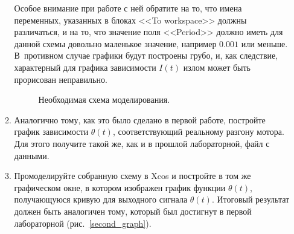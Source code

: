 \documentclass[12pt, a4paper, openany]{extarticle}
\begin{document}
\begin{enumerate}
\begin{enumerate}
Особое внимание при работе с ней обратите на то, что имена переменных, указанных в блоках <<\textsf{To workspace}>> должны различаться, и на то, что значение поля <<Period>> должно иметь для данной схемы довольно маленькое значение, например $0.001$ или меньше. 
В~противном случае графики будут построены грубо, и, как следствие, характерный для графика зависимости $I(t)$ излом может быть прорисован неправильно.  
\begin{figure}[h]
	\caption{Необходимая схема моделирования.}
	\label{struct_sheme_exp}
\end{figure}
\item Аналогично тому, как это было сделано в первой работе, постройте график зависимости $\theta(t)$, соответствующий реальному разгону мотора. Для этого получите такой же, как и в прошлой лабораторной, файл с данными.
\item Промоделируйте собранную схему в Xcos и постройте в том же графическом окне, в котором изображен график функции $\theta(t)$, получающуюся кривую для выходного сигнала $\theta(t)$. Итоговый результат должен быть аналогичен тому, который был достигнут в первой лабораторной (рис.~\ref{second_graph}).
\begin{figure}[h]

\end{figure}
\end{enumerate}
\end{enumerate}
\end{document}
